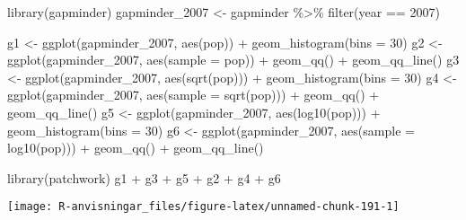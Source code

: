 \documentclass[
]{book}
\newenvironment{Shaded}{\begin{snugshade}}{\end{snugshade}}
\newcommand{\AttributeTok}[1]{\textcolor[rgb]{0.77,0.63,0.00}{#1}}
\newcommand{\DecValTok}[1]{\textcolor[rgb]{0.00,0.00,0.81}{#1}}
\newcommand{\FunctionTok}[1]{\textcolor[rgb]{0.00,0.00,0.00}{#1}}
\newcommand{\NormalTok}[1]{#1}
\newcommand{\OtherTok}[1]{\textcolor[rgb]{0.56,0.35,0.01}{#1}}
\newcommand{\SpecialCharTok}[1]{\textcolor[rgb]{0.00,0.00,0.00}{#1}}
\theoremstyle{definition}
\theoremstyle{definition}
\theoremstyle{definition}
\theoremstyle{definition}
\theoremstyle{remark}
\begin{document}
\begin{Shaded}
\begin{Highlighting}[]
\FunctionTok{library}\NormalTok{(gapminder)}
\NormalTok{gapminder\_2007 }\OtherTok{\textless{}{-}}\NormalTok{ gapminder }\SpecialCharTok{\%\textgreater{}\%} \FunctionTok{filter}\NormalTok{(year }\SpecialCharTok{==} \DecValTok{2007}\NormalTok{)}

\NormalTok{g1 }\OtherTok{\textless{}{-}} \FunctionTok{ggplot}\NormalTok{(gapminder\_2007, }\FunctionTok{aes}\NormalTok{(pop)) }\SpecialCharTok{+} \FunctionTok{geom\_histogram}\NormalTok{(}\AttributeTok{bins =} \DecValTok{30}\NormalTok{)}
\NormalTok{g2 }\OtherTok{\textless{}{-}} \FunctionTok{ggplot}\NormalTok{(gapminder\_2007, }\FunctionTok{aes}\NormalTok{(}\AttributeTok{sample =}\NormalTok{ pop)) }\SpecialCharTok{+} \FunctionTok{geom\_qq}\NormalTok{() }\SpecialCharTok{+} \FunctionTok{geom\_qq\_line}\NormalTok{()}
\NormalTok{g3 }\OtherTok{\textless{}{-}} \FunctionTok{ggplot}\NormalTok{(gapminder\_2007, }\FunctionTok{aes}\NormalTok{(}\FunctionTok{sqrt}\NormalTok{(pop))) }\SpecialCharTok{+} \FunctionTok{geom\_histogram}\NormalTok{(}\AttributeTok{bins =} \DecValTok{30}\NormalTok{)}
\NormalTok{g4 }\OtherTok{\textless{}{-}} \FunctionTok{ggplot}\NormalTok{(gapminder\_2007, }\FunctionTok{aes}\NormalTok{(}\AttributeTok{sample =} \FunctionTok{sqrt}\NormalTok{(pop))) }\SpecialCharTok{+} \FunctionTok{geom\_qq}\NormalTok{() }\SpecialCharTok{+} \FunctionTok{geom\_qq\_line}\NormalTok{()}
\NormalTok{g5 }\OtherTok{\textless{}{-}} \FunctionTok{ggplot}\NormalTok{(gapminder\_2007, }\FunctionTok{aes}\NormalTok{(}\FunctionTok{log10}\NormalTok{(pop))) }\SpecialCharTok{+} \FunctionTok{geom\_histogram}\NormalTok{(}\AttributeTok{bins =} \DecValTok{30}\NormalTok{)}
\NormalTok{g6 }\OtherTok{\textless{}{-}} \FunctionTok{ggplot}\NormalTok{(gapminder\_2007, }\FunctionTok{aes}\NormalTok{(}\AttributeTok{sample =} \FunctionTok{log10}\NormalTok{(pop))) }\SpecialCharTok{+} \FunctionTok{geom\_qq}\NormalTok{() }\SpecialCharTok{+} \FunctionTok{geom\_qq\_line}\NormalTok{()}

\FunctionTok{library}\NormalTok{(patchwork)}
\NormalTok{g1 }\SpecialCharTok{+}\NormalTok{ g3 }\SpecialCharTok{+}\NormalTok{ g5 }\SpecialCharTok{+}\NormalTok{ g2 }\SpecialCharTok{+}\NormalTok{ g4 }\SpecialCharTok{+}\NormalTok{ g6}
\end{Highlighting}
\end{Shaded}

\begin{center}\texttt{[image: R-anvisningar\_files/figure-latex/unnamed-chunk-191-1]} \end{center}
\end{document}
